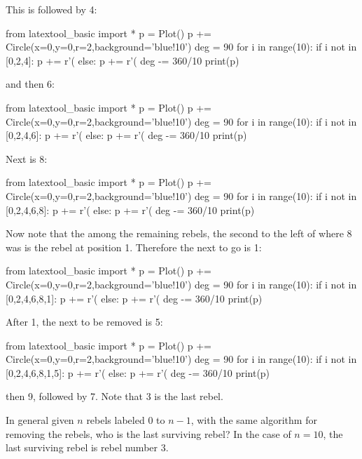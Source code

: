 This is followed by 4:
\begin{python}
from latextool_basic import *
p = Plot()
p += Circle(x=0,y=0,r=2,background='blue!10')
deg = 90
for i in range(10):
    if i not in [0,2,4]:
        p += r'\draw (%
    else:
        p += r'\draw (%
    deg -= 360/10
print(p)
\end{python}
and then 6:
\begin{python}
from latextool_basic import *
p = Plot()
p += Circle(x=0,y=0,r=2,background='blue!10')
deg = 90
for i in range(10):
    if i not in [0,2,4,6]:
        p += r'\draw (%
    else:
        p += r'\draw (%
    deg -= 360/10
print(p)
\end{python}
Next is 8:
\begin{python}
from latextool_basic import *
p = Plot()
p += Circle(x=0,y=0,r=2,background='blue!10')
deg = 90
for i in range(10):
    if i not in [0,2,4,6,8]:
        p += r'\draw (%
    else:
        p += r'\draw (%
    deg -= 360/10
print(p)
\end{python}
Now note that the among the remaining rebels, 
the second to the left of where 8 was is the rebel at position 1.
Therefore the next to go is 1:
\begin{python}
from latextool_basic import *
p = Plot()
p += Circle(x=0,y=0,r=2,background='blue!10')
deg = 90
for i in range(10):
    if i not in [0,2,4,6,8,1]:
        p += r'\draw (%
    else:
        p += r'\draw (%
    deg -= 360/10
print(p)
\end{python}
After 1, the next to be removed is 5:
\begin{python}
from latextool_basic import *
p = Plot()
p += Circle(x=0,y=0,r=2,background='blue!10')
deg = 90
for i in range(10):
    if i not in [0,2,4,6,8,1,5]:
        p += r'\draw (%
    else:
        p += r'\draw (%
    deg -= 360/10
print(p)
\end{python}
then 9, followed by 7. Note that 3 is the last rebel.

In general given $n$ rebels labeled $0$ to
 $n-1$, with the same algorithm for removing the rebels, 
who is the last surviving rebel?
In the case of $n = 10$, the last surviving rebel is
rebel number $3$.

